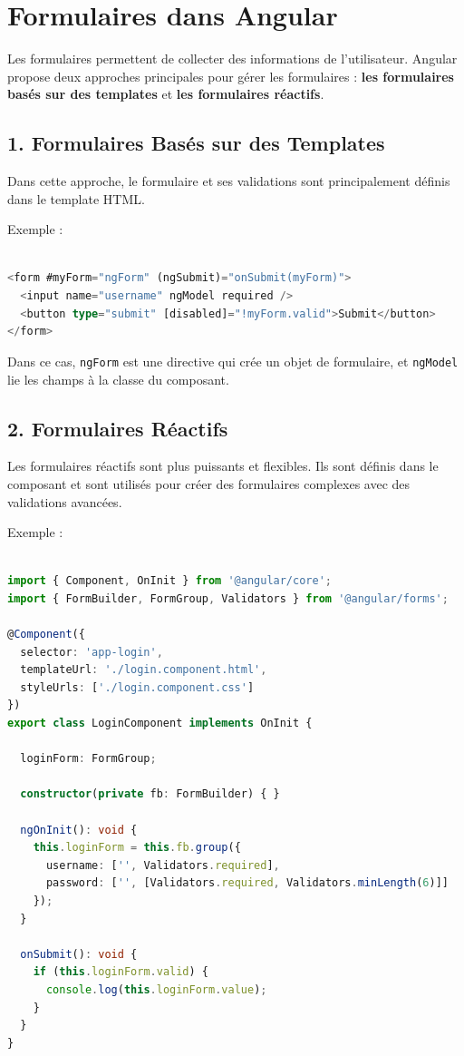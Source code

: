 \documentclass{article}
\begin{document}
\section*{Formulaires dans Angular}

Les formulaires permettent de collecter des informations de l'utilisateur. Angular propose deux approches principales pour gérer les formulaires : \textbf{les formulaires basés sur des templates} et \textbf{les formulaires réactifs}.

\subsection*{1. Formulaires Basés sur des Templates}

Dans cette approche, le formulaire et ses validations sont principalement définis dans le template HTML.

Exemple :
\begin{lstlisting}[language=TypeScript, caption={Using a service in a component}, label={lst:typescript-service-usage}]

<form #myForm="ngForm" (ngSubmit)="onSubmit(myForm)">
  <input name="username" ngModel required />
  <button type="submit" [disabled]="!myForm.valid">Submit</button>
</form>
\end{lstlisting}

Dans ce cas, \texttt{ngForm} est une directive qui crée un objet de formulaire, et \texttt{ngModel} lie les champs à la classe du composant.

\subsection*{2. Formulaires Réactifs}

Les formulaires réactifs sont plus puissants et flexibles. Ils sont définis dans le composant et sont utilisés pour créer des formulaires complexes avec des validations avancées.

Exemple :
\begin{lstlisting}[language=TypeScript, caption={Using a service in a component}, label={lst:typescript-service-usage}]

import { Component, OnInit } from '@angular/core';
import { FormBuilder, FormGroup, Validators } from '@angular/forms';

@Component({
  selector: 'app-login',
  templateUrl: './login.component.html',
  styleUrls: ['./login.component.css']
})
export class LoginComponent implements OnInit {

  loginForm: FormGroup;

  constructor(private fb: FormBuilder) { }

  ngOnInit(): void {
    this.loginForm = this.fb.group({
      username: ['', Validators.required],
      password: ['', [Validators.required, Validators.minLength(6)]]
    });
  }

  onSubmit(): void {
    if (this.loginForm.valid) {
      console.log(this.loginForm.value);
    }
  }
}
\end{lstlisting}
\end{document}
